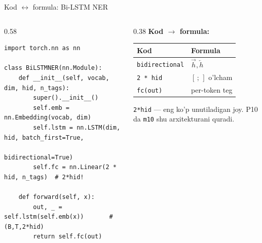 \documentclass[aspectratio=169,11pt]{beamer}
\begin{document}
\begin{frame}[fragile]{Kod $\leftrightarrow$ formula: Bi-LSTM NER}
  \begin{columns}[T]
    \begin{column}{0.58\textwidth}
\begin{lstlisting}
import torch.nn as nn

class BiLSTMNER(nn.Module):
    def __init__(self, vocab, dim, hid, n_tags):
        super().__init__()
        self.emb = nn.Embedding(vocab, dim)
        self.lstm = nn.LSTM(dim, hid, batch_first=True,
                            bidirectional=True)
        self.fc = nn.Linear(2 * hid, n_tags)  # 2*hid!

    def forward(self, x):
        out, _ = self.lstm(self.emb(x))       # (B,T,2*hid)
        return self.fc(out)
\end{lstlisting}
    \end{column}
    \begin{column}{0.38\textwidth}
      \textbf{Kod $\to$ formula:}\\[3pt]
      \footnotesize
      \begin{tabular}{p{1.7cm}p{1.9cm}}
        \toprule
        Kod & Formula \\
        \midrule
        \texttt{bidirectional} & $\overrightarrow{h},\overleftarrow{h}$ \\
        \texttt{2 * hid} & $[\,;\,]$ o'lcham \\
        \texttt{fc(out)} & per-token teg \\
        \bottomrule
      \end{tabular}
      \vspace{4pt}
      \begin{tcolorbox}[okbox,top=2pt,bottom=2pt]
        \footnotesize
        \texttt{2*hid} --- eng ko'p unutiladigan joy. P10 da \texttt{m10} shu
        arxitekturani quradi.
      \end{tcolorbox}
    \end{column}
  \end{columns}
\end{frame}
\end{document}
